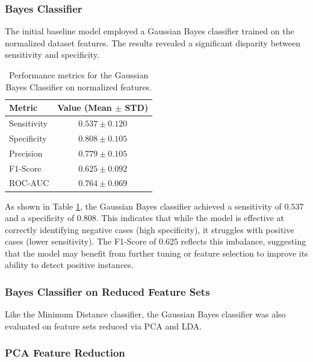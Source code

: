\documentclass[12pt,a4paper]{article}
\begin{document}
\subsubsection{Bayes Classifier}
The initial baseline model employed a Gaussian Bayes classifier trained on the normalized dataset features. The results revealed a significant disparity between sensitivity and specificity. 

\begin{table}[H]
    \centering
    \begin{tabular}{lc}
        \toprule
        \textbf{Metric} & \textbf{Value (Mean $\pm$ STD)} \\
        \midrule
        Sensitivity & $0.537 \pm 0.120$ \\
        Specificity & $0.808 \pm 0.105$ \\
        Precision   & $0.779 \pm 0.105$ \\
        F1-Score    & $0.625 \pm 0.092$ \\
        ROC-AUC     & $0.764 \pm 0.069$ \\
        \bottomrule
    \end{tabular}
    \caption{Performance metrics for the Gaussian Bayes Classifier on normalized features.}
    \label{tab:bayes_threshold}
\end{table}


As shown in Table \ref{tab:bayes_threshold}, the Gaussian Bayes classifier achieved a sensitivity of $0.537$ and a specificity of $0.808$. This indicates that while the model is effective at correctly identifying negative cases (high specificity), it struggles with positive cases (lower sensitivity). The F1-Score of $0.625$ reflects this imbalance, suggesting that the model may benefit from further tuning or feature selection to improve its ability to detect positive instances.

\subsubsection*{Bayes Classifier on Reduced Feature Sets}
Like the Minimum Distance classifier, the Gaussian Bayes classifier was also evaluated on feature sets reduced via PCA and LDA.

\subsubsection*{PCA Feature Reduction}
\end{document}
